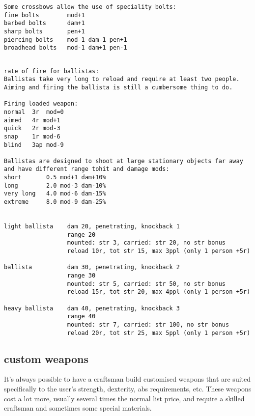 \begin{verbatim}
Some crossbows allow the use of speciality bolts:
fine bolts        mod+1
barbed bolts      dam+1
sharp bolts       pen+1
piercing bolts    mod-1 dam-1 pen+1
broadhead bolts   mod-1 dam+1 pen-1


\end{verbatim} \goodbreak \begin{verbatim}
rate of fire for ballistas:
Ballistas take very long to reload and require at least two people.
Aiming and firing the ballista is still a cumbersome thing to do.

Firing loaded weapon:
normal  3r  mod=0
aimed   4r mod+1
quick   2r mod-3
snap    1r mod-6
blind   3ap mod-9

Ballistas are designed to shoot at large stationary objects far away 
and have different range tohit and damage mods:
short       0.5 mod+1 dam+10%
long        2.0 mod-3 dam-10%
very long   4.0 mod-6 dam-15%
extreme     8.0 mod-9 dam-25%


light ballista    dam 20, penetrating, knockback 1
                  range 20
                  mounted: str 3, carried: str 20, no str bonus
                  reload 10r, tot str 15, max 3ppl (only 1 person +5r)

ballista          dam 30, penetrating, knockback 2
                  range 30
                  mounted: str 5, carried: str 50, no str bonus
                  reload 15r, tot str 20, max 4ppl (only 1 person +5r)

heavy ballista    dam 40, penetrating, knockback 3
                  range 40
                  mounted: str 7, carried: str 100, no str bonus
                  reload 20r, tot str 25, max 5ppl (only 1 person +5r)

\end{verbatim}
\normalsize








\subsection*{custom weapons}
It's always possible to have a craftsman build customised weapons that are suited specifically to the user's strength, dexterity, abs requirements, etc. These weapons cost a lot more, usually several times the normal list price, and require a skilled craftsman and sometimes some special materials.

